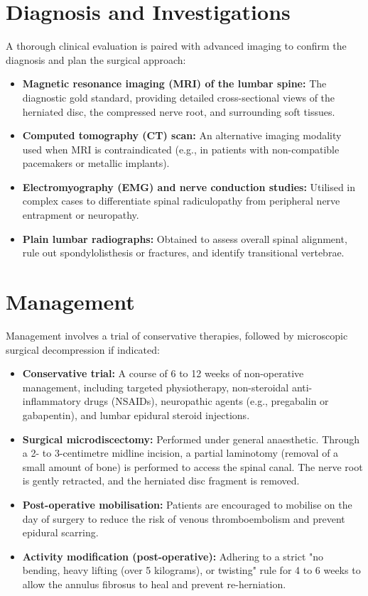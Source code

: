 \section*{Diagnosis and Investigations}
A thorough clinical evaluation is paired with advanced imaging to confirm the diagnosis and plan the surgical approach:
\begin{itemize}
    \item \textbf{Magnetic resonance imaging (MRI) of the lumbar spine:} The diagnostic gold standard, providing detailed cross-sectional views of the herniated disc, the compressed nerve root, and surrounding soft tissues.
    \item \textbf{Computed tomography (CT) scan:} An alternative imaging modality used when MRI is contraindicated (e.g., in patients with non-compatible pacemakers or metallic implants).
    \item \textbf{Electromyography (EMG) and nerve conduction studies:} Utilised in complex cases to differentiate spinal radiculopathy from peripheral nerve entrapment or neuropathy.
    \item \textbf{Plain lumbar radiographs:} Obtained to assess overall spinal alignment, rule out spondylolisthesis or fractures, and identify transitional vertebrae.
\end{itemize}

\section*{Management}
Management involves a trial of conservative therapies, followed by microscopic surgical decompression if indicated:
\begin{itemize}
    \item \textbf{Conservative trial:} A course of 6 to 12 weeks of non-operative management, including targeted physiotherapy, non-steroidal anti-inflammatory drugs (NSAIDs), neuropathic agents (e.g., pregabalin or gabapentin), and lumbar epidural steroid injections.
    \item \textbf{Surgical microdiscectomy:} Performed under general anaesthetic. Through a 2- to 3-centimetre midline incision, a partial laminotomy (removal of a small amount of bone) is performed to access the spinal canal. The nerve root is gently retracted, and the herniated disc fragment is removed.
    \item \textbf{Post-operative mobilisation:} Patients are encouraged to mobilise on the day of surgery to reduce the risk of venous thromboembolism and prevent epidural scarring.
    \item \textbf{Activity modification (post-operative):} Adhering to a strict "no bending, heavy lifting (over 5 kilograms), or twisting" rule for 4 to 6 weeks to allow the annulus fibrosus to heal and prevent re-herniation.
\end{itemize}


